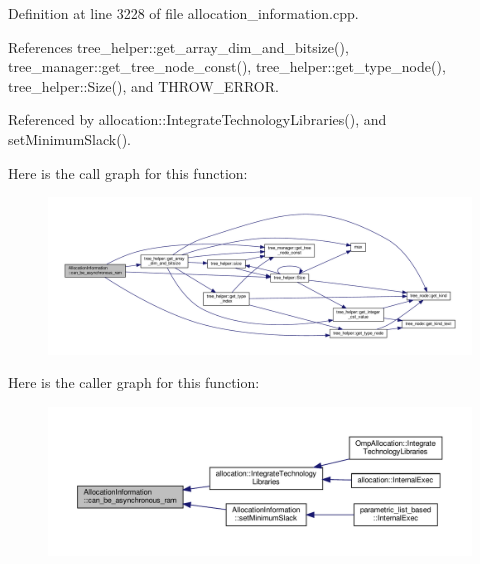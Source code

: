 Definition at line 3228 of file allocation\+\_\+information.\+cpp.



References tree\+\_\+helper\+::get\+\_\+array\+\_\+dim\+\_\+and\+\_\+bitsize(), tree\+\_\+manager\+::get\+\_\+tree\+\_\+node\+\_\+const(), tree\+\_\+helper\+::get\+\_\+type\+\_\+node(), tree\+\_\+helper\+::\+Size(), and T\+H\+R\+O\+W\+\_\+\+E\+R\+R\+OR.



Referenced by allocation\+::\+Integrate\+Technology\+Libraries(), and set\+Minimum\+Slack().

Here is the call graph for this function\+:
\nopagebreak
\begin{figure}[H]
\begin{center}
\leavevmode
\includegraphics[width=350pt]{d7/d79/classAllocationInformation_a3f008043819189ad03f0d1d8c510c626_cgraph}
\end{center}
\end{figure}
Here is the caller graph for this function\+:
\nopagebreak
\begin{figure}[H]
\begin{center}
\leavevmode
\includegraphics[width=350pt]{d7/d79/classAllocationInformation_a3f008043819189ad03f0d1d8c510c626_icgraph}
\end{center}
\end{figure}
\mbox{\label{classAllocationInformation_a09aeaf5be6c6e2bcafa1b358dfa287cc}} 
